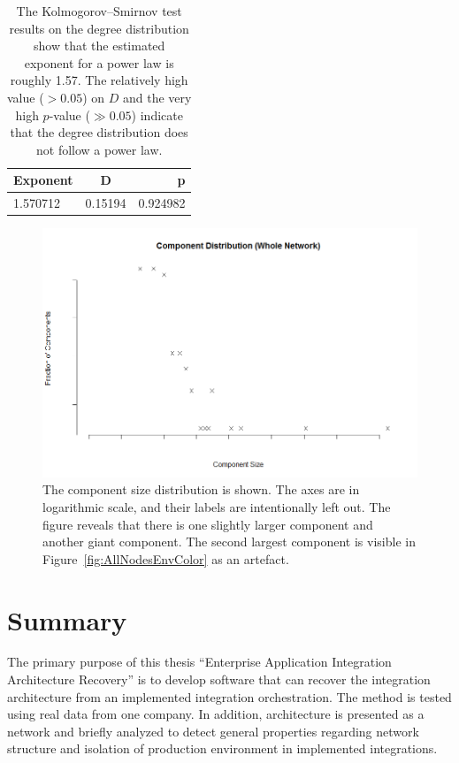 \documentclass[english, 12pt, a4paper, sci, utf8, a-2b, online, obeyspaces]{aaltothesis}
\begin{document}
\begin{table}[htb]
\centering
\begin{tabular}{ l c r }
  Exponent & D & p \\
  \hline
  1.570712 & 0.15194 & 0.924982 \\
\end{tabular}
\caption{The Kolmogorov–Smirnov test results on the degree distribution show that the estimated exponent for a power law is roughly 1.57. The relatively high value ($ > 0.05$) on $D$ and the very high $p$-value ($ \gg 0.05 $) indicate that the degree distribution does not follow a power law.}
  \label{tab:degree_distribution}
\end{table}

\begin{figure}[htbp]
  \centering
  \includegraphics[width=\textwidth]{pictures/network/ComponentDistributionWhole.png}
  \caption{The component size distribution is shown. The axes are in logarithmic scale, and their labels are intentionally left out. The figure reveals that there is one slightly larger component and another giant component. The second largest component is visible in Figure~\ref{fig:AllNodesEnvColor} as an artefact.}
  \label{fig:ComponentDistributionWhole}
\end{figure}

\clearpage
\section{Summary}
\label{sec:summary}

The primary purpose of this thesis “Enterprise Application Integration
Architecture Recovery” is to develop software that can recover the integration architecture from an implemented integration orchestration. The method is tested using real data from one company. In addition, architecture is presented as a network and briefly analyzed to detect general properties regarding network structure and isolation of production environment in implemented integrations.
\end{document}
